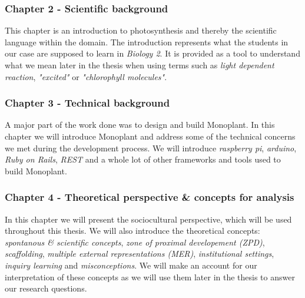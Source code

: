 \subsubsection*{Chapter 2 - Scientific background}
This chapter is an introduction to photosynthesis and thereby the scientific language within the domain. The introduction represents what the students in our case are supposed to learn in \emph{Biology 2}. It is provided as a tool to understand what we mean later in the thesis when using terms such as \emph{light dependent reaction}, \emph{"excited"} or \emph{"chlorophyll molecules"}.

\subsubsection*{Chapter 3 - Technical background}
A major part of the work done was to design and build Monoplant. In this chapter we will introduce Monoplant and address some of the technical concerns we met during the development process. We will introduce \emph{raspberry pi}, \emph{arduino}, \emph{Ruby on Rails}, \emph{REST} and a whole lot of other frameworks and tools used to build Monoplant.

\subsubsection*{Chapter 4 - Theoretical perspective \& concepts for analysis}

In this chapter we will present the sociocultural perspective, which will be used throughout this thesis. We will also introduce the theoretical concepts: \emph{spontanous \& scientific concepts}, \emph{zone of proximal developement (ZPD)}, \emph{scaffolding}, \emph{multiple external representations (MER)}, \emph{institutional settings}, \emph{inquiry learning} and \emph{misconceptions}. We will make an account for our interpretation of these concepts as we will use them later in the thesis to answer our research questions. 


